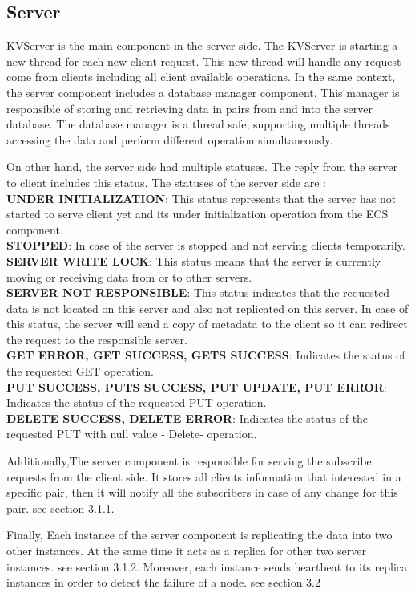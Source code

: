 \documentclass{sig-alternate}
\begin{document}
\subsection{Server}\label{serverimpl}
KVServer is the main component in the server side. The KVServer is starting a new thread for each new client request. This new thread will handle any request come from clients including all client available operations.
In the same context, the server component includes a database manager component. This manager is responsible of storing and retrieving data in pairs from and into the server database. The database manager is a thread safe, supporting multiple threads accessing the data and perform different operation simultaneously. 

On other hand, the server side had multiple statuses. The reply from the server to client includes this status. The statuses of the server side are :\\
\textbf{UNDER INITIALIZATION}: This status represents that the server has not started to serve client yet and its under initialization operation from the ECS component.\\
\textbf{STOPPED}: In case of the server is stopped and not serving clients temporarily.\\
\textbf{SERVER WRITE LOCK}: This status means that the server is currently moving or receiving data from or to other servers.\\
\textbf{SERVER NOT RESPONSIBLE}: This status indicates that the requested data is not located on this server and also not replicated on this server. In case of this status, the server will send a copy of metadata to the client so it can redirect the request to the responsible server.\\
\textbf{GET ERROR, GET SUCCESS, GETS SUCCESS}: Indicates the status of the requested GET operation.\\
\textbf{PUT SUCCESS, PUTS SUCCESS, PUT UPDATE, PUT ERROR}: Indicates the status of the requested PUT operation.\\
\textbf{DELETE SUCCESS, DELETE ERROR}: Indicates the status of the requested PUT with null value - Delete- operation.

Additionally,The server component is responsible for serving the subscribe requests from the client side. It stores all clients information that interested in a specific pair, then it will notify all the subscribers in case of any change for this pair. see section 3.1.1.

Finally, Each instance of the server component is replicating the data into two other instances. At the same time it acts as a replica for other two server instances. see section 3.1.2. Moreover, each instance sends heartbeat to its replica instances in order to detect the failure of a node. see section 3.2
\end{document}

